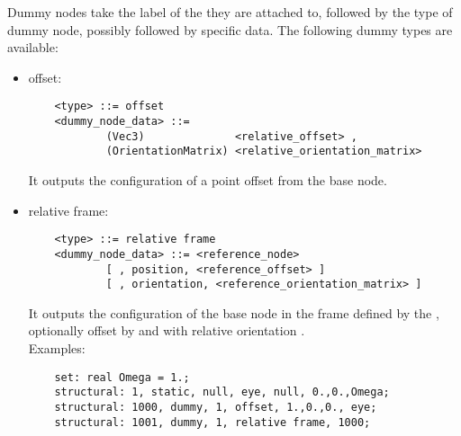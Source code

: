 Dummy nodes take the label of the  they are attached to, 
followed by the type of dummy node, possibly followed by specific data.
The following dummy types are available:

\begin{itemize}

    \item offset:
    \begin{verbatim}
    <type> ::= offset
    <dummy_node_data> ::=
            (Vec3)              <relative_offset> ,
            (OrientationMatrix) <relative_orientation_matrix>
    \end{verbatim}
    It outputs the configuration of a point offset from the base node.
            
    \item relative frame:
    \begin{verbatim}
    <type> ::= relative frame
    <dummy_node_data> ::= <reference_node>
            [ , position, <reference_offset> ]
            [ , orientation, <reference_orientation_matrix> ]
    \end{verbatim}
    It outputs the configuration of the base node in the frame defined
    by the , optionally offset 
    by  and with relative orientation 
    .\\
    Examples:
    \begin{verbatim}
    set: real Omega = 1.;
    structural: 1, static, null, eye, null, 0.,0.,Omega;
    structural: 1000, dummy, 1, offset, 1.,0.,0., eye;
    structural: 1001, dummy, 1, relative frame, 1000;
    \end{verbatim}

\end{itemize}

